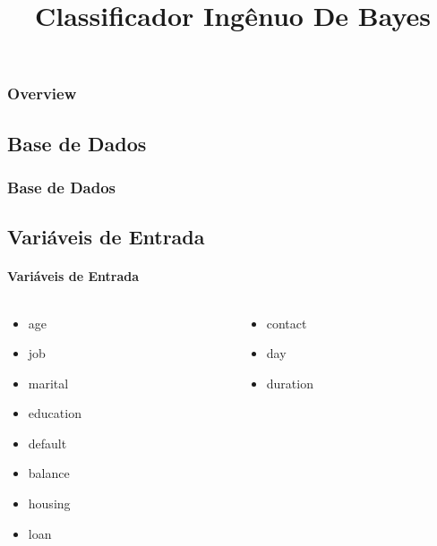 \documentclass{beamer}
\title{Classificador Ingênuo De Bayes}
\begin{document}
\maketitle

\begin{frame}
\frametitle{Overview}
\tableofcontents
\end{frame}

\begin{frame}
\section{Base de Dados}
\frametitle{Base de Dados}
\subsection{Variáveis de Entrada}
\framesubtitle{Variáveis de Entrada}

\begin{columns}
    \begin{column}{0.5\textwidth}
        \begin{itemize}
            \item age
        
            \item job
        
            \item marital
        
            \item education
        
            \item default
        
            \item balance 
        
            \item housing
        
            \item loan
        
     
        \end{itemize}
    \end{column}
    \begin{column}{0.5\textwidth}
        \begin{itemize}
            \item contact
            
            \item day 
        
            \item duration
        

\end{itemize}
\end{column}
\end{columns}
\end{frame}
\end{document}

